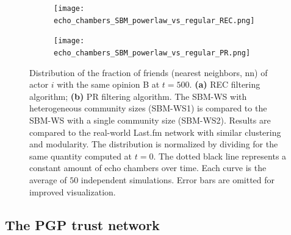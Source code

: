 \documentclass[11 pt , letterpaper , twoside , openright]{book}
\begin{document}
\begin{figure}[H]
  \begin{subfigure}[b]{0.49\textwidth}
    \caption{}
  	\texttt{[image: echo\_chambers\_SBM\_powerlaw\_vs\_regular\_REC.png]}
    \label{pr_pow_single}
  \end{subfigure}
  \begin{subfigure}[b]{0.49\textwidth}
    \caption{}
  	\texttt{[image: echo\_chambers\_SBM\_powerlaw\_vs\_regular\_PR.png]}
    \label{rec_pow_single}
  \end{subfigure}
  \captionsetup{format=plain}
  \caption[Distribution of the fraction of friends (nearest neighbors, nn) of actor $i$ with the same opinion B at $t = 500$. The SBM-WS with heterogeneous community sizes is compared to the SBM-WS with a single community size. Results are compared to the real-world Last.fm network with similar clustering and modularity. Results for the REC and PR filtering algorithms.]{Distribution of the fraction of friends (nearest neighbors, nn) of actor $i$ with the same opinion B at $t = 500$. \textbf{(a)} REC filtering algorithm; \textbf{(b)} PR filtering algorithm. The SBM-WS with heterogeneous community sizes (SBM-WS1) is compared to the SBM-WS with a single community size (SBM-WS2). Results are compared to the real-world Last.fm network with similar clustering and modularity. The distribution is normalized by dividing for the same quantity computed at $t=0$. The dotted black line represents a constant amount of echo chambers over time. Each curve is the average of $50$ independent simulations. Error bars are omitted for improved visualization.}
\label{power_vs_single}
\end{figure}

\subsection{The PGP trust network}
\end{document}
